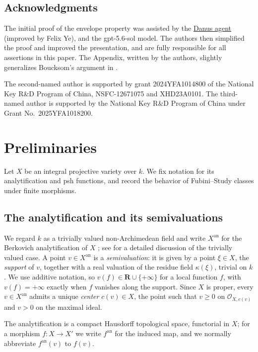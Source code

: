 \documentclass[11pt,a4paper]{article}
\newcommand{\an}{\mathrm{an}}          %
\begin{document}
\subsection*{Acknowledgments}
The initial proof of the envelope property was assisted by the \href{https://github.com/frenzymath/Danus}{Danus agent} (improved by Felix Ye), and the gpt-5.6-sol model. The authors then simplified the proof and improved the presentation, and are fully responsible for all assertions in this paper. The Appendix, written by the authors, slightly generalizes Boucksom's argument in \cite[Appendix~A]{T26App}.

The second-named author is supported by grant 2024YFA1014800 of the National Key R\&D Program of China, NSFC-12671075 and XHD23A0101. The third-named author is supported by the National Key R\&D Program of China under Grant No.~2025YFA1018200.


\section{Preliminaries}\label{sec:preliminaries}

Let $X$ be an integral projective variety over $k$. We fix notation for its analytification and psh functions, and record the behavior of Fubini--Study classes under finite morphisms.

\subsection{The analytification and its semivaluations}
\label{subsec:prelim-berkovich}

We regard $k$ as a trivially valued non-Archimedean field and write $X^{\an}$ for the Berkovich analytification of $X$ \cite{Berkovich90}; see \cite[\S1]{BJ22} for a detailed discussion of the trivially valued case.  A point $v\in X^{\an}$ is a \emph{semivaluation}: it is given by a point $\xi\in X$, the \emph{support} of $v$, together with a real valuation of the residue field $\kappa(\xi)$, trivial on $k$.  We use additive notation, so $v(f)\in\mathbf{R}\cup\{+\infty\}$ for a local function $f$, with $v(f)=+\infty$ exactly when $f$ vanishes along the support.  Since $X$ is proper, every $v\in X^{\an}$ admits a unique \emph{center} $c(v)\in X$, the point such that $v\geq0$ on $\mathcal{O}_{X,c(v)}$ and $v>0$ on the maximal ideal.

The analytification is a compact Hausdorff topological space, functorial in $X$; for a morphism $f\colon X\to X'$ we write $f^{\an}$ for the induced map, and we normally abbreviate $f^{\an}(v)$ to $f(v)$.
\end{document}
